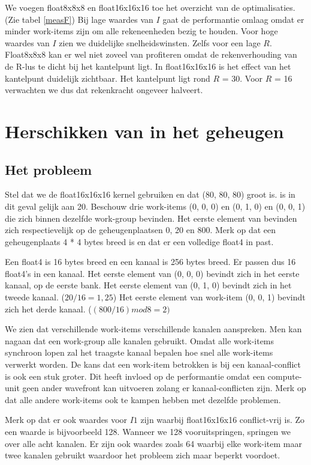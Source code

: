 We voegen float8x8x8 en float16x16x16 toe het overzicht van de optimalisaties. (Zie tabel \ref{measF}) Bij lage waardes van $I$ gaat de performantie omlaag omdat er minder work-items zijn om alle rekeneenheden bezig te houden. Voor hoge waardes van $I$ zien we duidelijke snelheidswinsten. Zelfs voor een lage $R$. Float8x8x8 kan er wel niet zoveel van profiteren omdat de rekenverhouding van de R-lus te dicht bij het kantelpunt ligt. In float16x16x16 is het effect van het kantelpunt duidelijk zichtbaar. Het kantelpunt ligt rond $R$ = 30. Voor $R$ = 16 verwachten we dus dat rekenkracht ongeveer halveert.


\section{Herschikken van \TT{} in het geheugen}
\subsection{Het probleem}
Stel dat we de float16x16x16 kernel gebruiken en dat \TT{} (80, 80, 80) groot is.  is in dit geval gelijk aan 20. Beschouw drie work-items (0, 0, 0) en (0, 1, 0) en (0, 0, 1) die zich binnen dezelfde work-group bevinden. Het eerste element van \TT{} bevinden zich respectievelijk op de geheugenplaatsen 0, 20 en 800. Merk op dat een geheugenplaats 4 * 4 bytes breed is en dat er een volledige float4 in past.

Een float4 is 16 bytes breed en een kanaal is 256 bytes breed. Er passen dus 16 float4's in een kanaal. Het eerste element van (0, 0, 0) bevindt zich in het eerste kanaal, op de eerste bank. Het eerste element van (0, 1, 0) bevindt zich in het tweede kanaal. ($20 / 16 = 1,25$) Het eerste element van work-item (0, 0, 1) bevindt zich het derde kanaal. ($(800 / 16) mod 8 = 2)$

We zien dat verschillende work-items verschillende kanalen aanspreken. Men kan nagaan dat een work-group alle kanalen gebruikt. Omdat alle work-items synchroon lopen zal het traagste kanaal bepalen hoe snel alle work-items verwerkt worden. De kans dat een work-item betrokken is bij een kanaal-conflict is ook een stuk groter. Dit heeft invloed op de performantie omdat een compute-unit geen ander wavefront kan uitvoeren zolang er kanaal-conflicten zijn. Merk op dat alle andere work-items ook te kampen hebben met dezelfde problemen.

Merk op dat er ook waardes voor $I1$ zijn waarbij float16x16x16 conflict-vrij is. Zo een waarde is bijvoorbeeld 128. Wanneer we 128 vooruitspringen, springen we over alle acht kanalen. Er zijn ook waardes zoals 64 waarbij elke work-item maar twee kanalen gebruikt waardoor het probleem zich maar beperkt voordoet.

